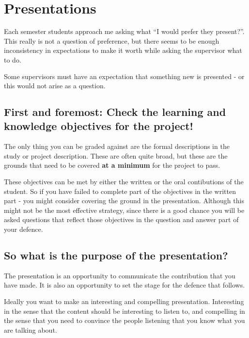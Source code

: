 \documentclass[
]{book}
\begin{document}
\hypertarget{presentations}{%
\chapter{Presentations}\label{presentations}}

Each semester students approach me asking what ``I would prefer they present?''. This really is not a question of preference, but there seems to be enough inconsistency in expectations to make it worth while asking the supervisor what to do.

Some supervisors must have an expectation that something new is presented - or this would not arise as a question.

\hypertarget{first-and-foremost-check-the-learning-and-knowledge-objectives-for-the-project}{%
\section{First and foremost: Check the learning and knowledge objectives for the project!}\label{first-and-foremost-check-the-learning-and-knowledge-objectives-for-the-project}}

The only thing you can be graded against are the formal descriptions in the study or project description. These are often quite broad, but these are the grounds that need to be covered \textbf{at a minimum} for the project to pass.

These objectives can be met by either the written or the oral contibutions of the student. So if you have failed to complete part of the objectives in the written part - you might consider covering the ground in the presentation. Although this might not be the most effective strategy, since there is a good chance you will be asked questions that reflect those objectives in the question and answer part of your defence.

\hypertarget{so-what-is-the-purpose-of-the-presentation}{%
\section{So what is the purpose of the presentation?}\label{so-what-is-the-purpose-of-the-presentation}}

The presentation is an opportunity to communicate the contribution that you have made. It is also an opportunity to set the stage for the defence that follows.

Ideally you want to make an interesting and compelling presentation. Interesting in the sense that the content should be interesting to listen to, and compelling in the sense that you need to convince the people listening that you know what you are talking about.
\end{document}
